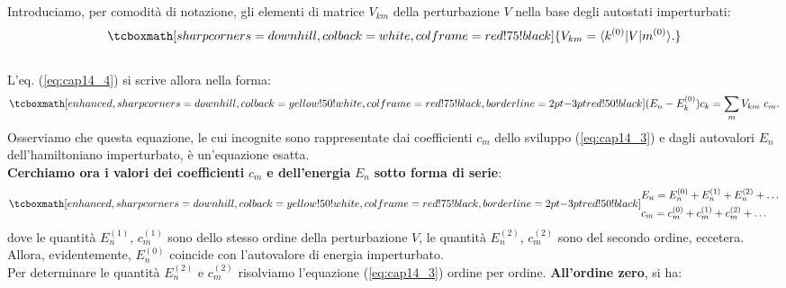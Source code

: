 Introduciamo, per comodità di notazione, gli elementi di matrice $V_{km}$ della perturbazione $V$ nella base degli autostati imperturbati:
	\begin{equation}
		\tcboxmath[sharp corners=downhill, colback=white, colframe=red!75!black]{
			V_{km} = \langle k^{(0)}\vert V\vert m^{(0)}\rangle.
			}
	\end{equation}\\
	
L'eq. (\ref{eq:cap14_4}) si scrive allora nella forma:
	\begin{equation}
		\tcboxmath[enhanced, sharp corners=downhill, colback=yellow!50!white, colframe=red!75!black, borderline={2pt}{-3pt}{red!50!black}]{	(E_n - E_k ^{(0)}) c_k = \sum _m V_{km}\ c_m .
		}
	\label{eq:cap14_5}
	\end{equation}
Osserviamo che questa equazione, le cui incognite sono rappresentate dai coefficienti $c_m$ dello sviluppo (\ref{eq:cap14_3}) e dagli autovalori $E_n$ dell'hamiltoniano imperturbato, è un'equazione esatta.\\

\textbf{Cerchiamo ora i valori dei coefficienti} $c_m$ \textbf{e dell'energia} $E_n$ \textbf{sotto forma di serie}:
	\begin{equation}
		\tcboxmath[enhanced, sharp corners=downhill, colback=yellow!50!white, colframe=red!75!black, borderline={2pt}{-3pt}{red!50!black}]{
		\begin{aligned}
			& E_n = E_n ^{(0)}+E_n ^{(1)}+E_n ^{(2)}+\dots  \\
			& c_m = c_m ^{(0)}+c_m ^{(1)}+c_m ^{(2)}+\dots
		\end{aligned}
		}
	\end{equation}
dove le quantità $E_n ^{(1)}$, $c_m ^{(1)}$ sono dello stesso ordine della perturbazione $V$, le quantità $E_n ^{(2)}$, $c_m ^{(2)}$ sono del secondo ordine, eccetera. Allora, evidentemente, $E_n ^{(0)}$ coincide con l'autovalore di energia imperturbato.\\

Per determinare le quantità $E_n ^{(2)}$ e $c_m ^{(2)}$ risolviamo l'equazione (\ref{eq:cap14_3}) ordine per ordine. \textbf{All'ordine zero}, si ha:\\


